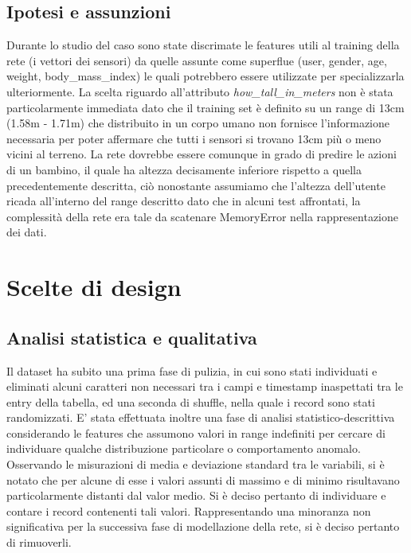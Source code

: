 \documentclass[12pt]{article}
\begin{document}
\subsection{Ipotesi e assunzioni}
Durante lo studio del caso sono state discrimate le features utili al training della rete (i vettori dei sensori) da quelle assunte come superflue (user, gender, age, weight, body\_mass\_index) le quali potrebbero essere utilizzate per specializzarla ulteriormente.\newline
La scelta riguardo all'attributo \emph{how\_tall\_in\_meters} non è stata particolarmente immediata dato che il training set è definito su un range di 13cm (1.58m - 1.71m) che distribuito in un corpo umano non fornisce l'informazione necessaria per poter affermare che tutti i sensori si trovano 13cm più o meno vicini al terreno. La rete dovrebbe essere comunque in grado di predire le azioni di un bambino, il quale ha altezza decisamente inferiore rispetto a quella precedentemente descritta, ciò nonostante assumiamo che l'altezza dell'utente ricada all'interno del range descritto dato che in alcuni test affrontati, la complessità della rete era tale da scatenare MemoryError nella rappresentazione dei dati.

\section{Scelte di design}
\subsection{Analisi statistica e qualitativa}
Il dataset ha subito una prima fase di pulizia, in cui sono stati individuati e eliminati alcuni caratteri non necessari tra i campi e timestamp inaspettati tra le entry della tabella, ed una seconda di shuffle, nella quale i record sono stati randomizzati. \newline
E' stata effettuata inoltre una fase di analisi statistico-descrittiva considerando le features che assumono valori in range indefiniti per cercare di individuare qualche distribuzione particolare o comportamento anomalo. Osservando le misurazioni di media e deviazione standard tra le variabili, si è notato che per alcune di esse i valori assunti di massimo e di minimo risultavano particolarmente distanti dal valor medio. Si è deciso pertanto di individuare e contare i record contenenti tali valori. Rappresentando una minoranza non significativa per la successiva fase di modellazione della rete, si è deciso pertanto di rimuoverli.
\end{document}
